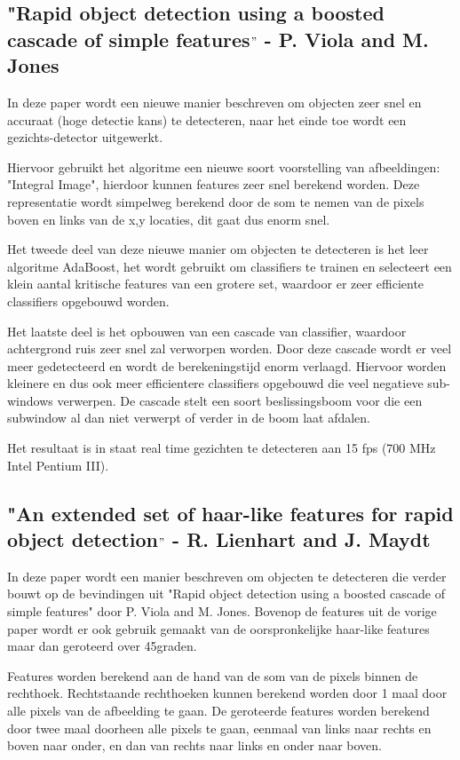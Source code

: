 \documentclass[]{article}
\begin{document}
\subsection*{"Rapid object detection using a boosted cascade of simple features$"$ -  P. Viola and M. Jones}

In deze paper wordt een nieuwe manier beschreven om objecten zeer snel en accuraat (hoge detectie kans) te detecteren, naar het einde toe wordt een gezichts-detector uitgewerkt.

Hiervoor gebruikt het algoritme een nieuwe soort voorstelling van afbeeldingen: "Integral Image", hierdoor kunnen features zeer snel berekend worden. Deze representatie wordt simpelweg berekend door de som te nemen van de pixels boven en links van de x,y locaties, dit gaat dus enorm snel.

Het tweede deel van deze nieuwe manier om objecten te detecteren is het leer algoritme AdaBoost, het wordt gebruikt om classifiers te trainen en selecteert een klein aantal kritische features van een grotere set, waardoor er zeer efficiente classifiers opgebouwd worden.

Het laatste deel is het opbouwen van een cascade van classifier, waardoor achtergrond ruis zeer snel zal verworpen worden. Door deze cascade wordt er veel meer gedetecteerd en wordt de berekeningstijd enorm verlaagd. Hiervoor worden kleinere en dus ook meer efficientere classifiers opgebouwd die veel negatieve sub-windows verwerpen. De cascade stelt een soort beslissingsboom voor die een subwindow al dan niet verwerpt of verder in de boom laat afdalen.

Het resultaat is in staat real time gezichten te detecteren aan 15 fps (700 MHz Intel Pentium III).

\subsection*{"An extended set of haar-like features for rapid object detection$"$ - R. Lienhart and J. Maydt}

In deze paper wordt een manier beschreven om objecten te detecteren die verder bouwt op de bevindingen uit "Rapid object detection using a boosted cascade of simple features" door P. Viola and M. Jones.
Bovenop de features uit de vorige paper wordt er ook gebruik gemaakt van de oorspronkelijke haar-like features maar dan geroteerd over 45graden.

Features worden berekend aan de hand van de som van de pixels binnen de rechthoek. Rechtstaande rechthoeken kunnen berekend worden door 1 maal door alle pixels van de afbeelding te gaan. De geroteerde features worden berekend door twee maal doorheen alle pixels te gaan, eenmaal van links naar rechts en boven naar onder, en dan van rechts naar links en onder naar boven.
\end{document}
